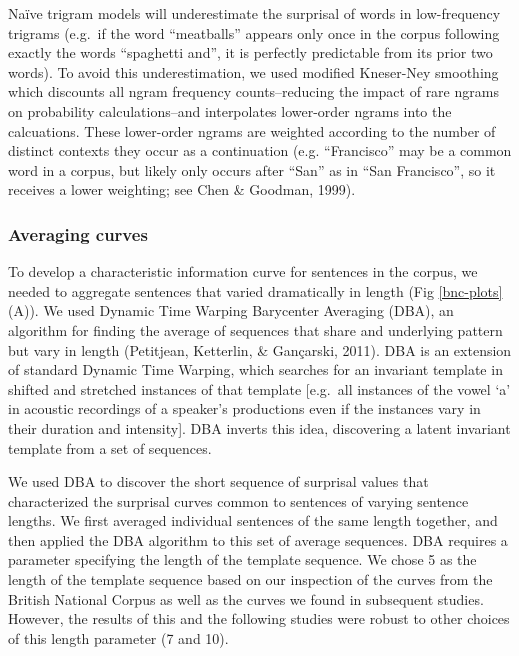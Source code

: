 \documentclass[10pt, letterpaper]{article}
\begin{document}
Naïve trigram models will underestimate the surprisal of words in
low-frequency trigrams (e.g.~if the word ``meatballs'' appears only once
in the corpus following exactly the words ``spaghetti and'', it is
perfectly predictable from its prior two words). To avoid this
underestimation, we used modified Kneser-Ney smoothing which discounts
all ngram frequency counts--reducing the impact of rare ngrams on
probability calculations--and interpolates lower-order ngrams into the
calcuations. These lower-order ngrams are weighted according to the
number of distinct contexts they occur as a continuation (e.g.
``Francisco'' may be a common word in a corpus, but likely only occurs
after ``San'' as in ``San Francisco'', so it receives a lower weighting;
see Chen \& Goodman, 1999).

\hypertarget{averaging-curves}{%
\subsubsection{Averaging curves}\label{averaging-curves}}

To develop a characteristic information curve for sentences in the
corpus, we needed to aggregate sentences that varied dramatically in
length (Fig \ref{bnc-plots}(A)). We used Dynamic Time Warping Barycenter
Averaging (DBA), an algorithm for finding the average of sequences that
share and underlying pattern but vary in length (Petitjean, Ketterlin,
\& Gançarski, 2011). DBA is an extension of standard Dynamic Time
Warping, which searches for an invariant template in shifted and
stretched instances of that template {[}e.g.~all instances of the vowel
`a' in acoustic recordings of a speaker's productions even if the
instances vary in their duration and intensity{]}. DBA inverts this
idea, discovering a latent invariant template from a set of sequences.

We used DBA to discover the short sequence of surprisal values that
characterized the surprisal curves common to sentences of varying
sentence lengths. We first averaged individual sentences of the same
length together, and then applied the DBA algorithm to this set of
average sequences. DBA requires a parameter specifying the length of the
template sequence. We chose 5 as the length of the template sequence
based on our inspection of the curves from the British National Corpus
as well as the curves we found in subsequent studies. However, the
results of this and the following studies were robust to other choices
of this length parameter (7 and 10).
\end{document}
